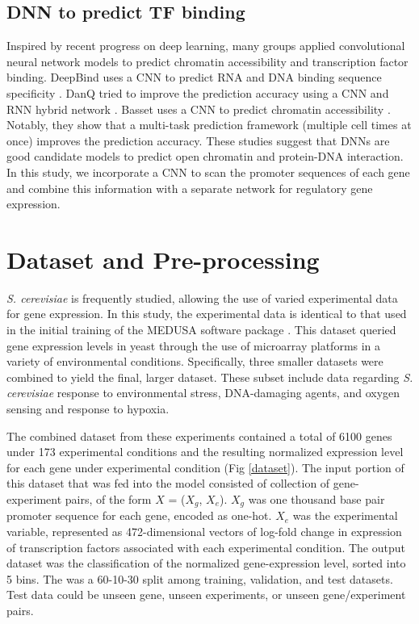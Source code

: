 \documentclass{article}
\begin{document}
\subsection{DNN to predict TF binding}
Inspired by recent progress on deep learning, many groups applied convolutional neural network models to predict chromatin accessibility and transcription factor binding. DeepBind uses a CNN to predict RNA and DNA binding sequence specificity \cite{Alipanahi:2015fb}. DanQ tried to improve the prediction accuracy using a CNN and RNN hybrid network \cite{Quang:2016jt}. Basset uses a CNN to predict chromatin accessibility \cite{Kelley:2016bv}. Notably, they show that a multi-task prediction framework (multiple cell times at once) improves the prediction accuracy. These studies suggest that DNNs are good candidate models to predict open chromatin and protein-DNA interaction. In this study, we incorporate a CNN to scan the promoter sequences of each gene and combine this information with a separate network for regulatory gene expression. 

\section{Dataset and Pre-processing}

\textit{S. cerevisiae} is frequently studied, allowing the use of varied experimental data for gene expression. In this study, the experimental data is identical to that used in the initial training of the MEDUSA software package \cite{Kundaje:2007hs}. This dataset queried gene expression levels in yeast through the use of microarray platforms in a variety of environmental conditions. Specifically, three smaller datasets were combined to yield the final, larger dataset. These subset include data regarding \textit{S. cerevisiae} response to environmental stress, DNA-damaging agents, and oxygen sensing and response to hypoxia.

The combined dataset from these experiments contained a total of 6100 genes under 173 experimental conditions and the resulting normalized expression level for each gene under experimental condition (Fig \ref{dataset}). The input portion of this dataset that was fed into the model consisted of collection of gene-experiment pairs, of the form $X$ = ($X_g$, $X_e$). $X_g$ was one thousand base pair promoter sequence for each gene, encoded as one-hot. $X_e$ was the experimental variable, represented as 472-dimensional vectors of log-fold change in expression of transcription factors associated with each experimental condition. The output dataset was the classification of the normalized gene-expression level, sorted into 5 bins. The was a 60-10-30 split among training, validation, and test datasets. Test data could be unseen gene, unseen experiments, or unseen gene/experiment pairs.
\end{document}
